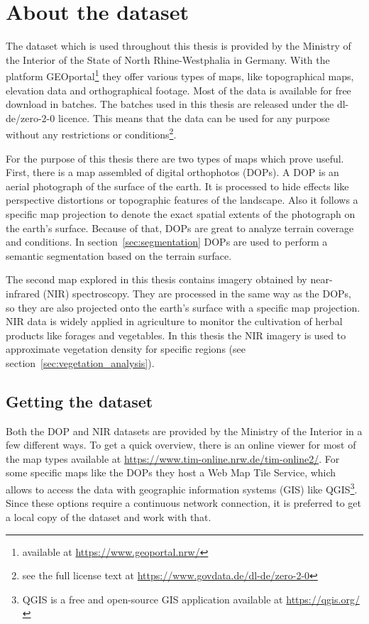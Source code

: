 \section{About the dataset}
\label{sec:dataset_analysis}

The dataset which is used throughout this thesis is provided by the Ministry of the Interior of the State of North Rhine-Westphalia in Germany. With the platform GEOportal\footnote{available at \url{https://www.geoportal.nrw/}} they offer various types of maps, like topographical maps, elevation data and orthographical footage. Most of the data is available for free download in batches. The batches used in this thesis are released under the dl-de/zero-2-0 licence. This means that the data can be used for any purpose without any restrictions or conditions\footnote{see the full license text at \url{https://www.govdata.de/dl-de/zero-2-0}}.

For the purpose of this thesis there are two types of maps which prove useful. First, there is a map assembled of digital orthophotos (DOPs). A DOP is an aerial photograph of the surface of the earth. It is processed to hide effects like perspective distortions or topographic features of the landscape. Also it follows a specific map projection to denote the exact spatial extents of the photograph on the earth's surface. Because of that, DOPs are great to analyze terrain coverage and conditions. In section~\ref{sec:segmentation} DOPs are used to perform a semantic segmentation based on the terrain surface.

The second map explored in this thesis contains imagery obtained by near-infrared (NIR) spectroscopy. They are processed in the same way as the DOPs, so they are also projected onto the earth's surface with a specific map projection. NIR data is widely applied in agriculture to monitor the cultivation of herbal products like forages and vegetables. In this thesis the NIR imagery is used to approximate vegetation density for specific regions (see section~\ref{sec:vegetation_analysis}).

\subsection{Getting the dataset}
Both the DOP and NIR datasets are provided by the Ministry of the Interior in a few different ways. To get a quick overview, there is an online viewer for most of the map types available at \url{https://www.tim-online.nrw.de/tim-online2/}. For some specific maps like the DOPs they host a Web Map Tile Service, which allows to access the data with geographic information systems (GIS) like QGIS\footnote{QGIS is a free and open-source GIS application available at \url{https://qgis.org/}}. Since these options require a continuous network connection, it is preferred to get a local copy of the dataset and work with that.

